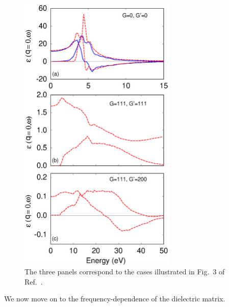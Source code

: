\documentclass[twocolumn,prb,showpacs,superscriptaddress]{revtex4}
\begin{document}
\begin  {figure}
\begin  {center}
\includegraphics[width=7.5cm]{fig.diel.eps}
\end    {center}
\caption{\label{fig.diel}
        The three panels correspond to the
        cases illustrated in Fig.\ 3 of Ref.\ .
        }
\end    {figure}


We now move on to the frequency-dependence of the dielectric matrix.
\end{document}
